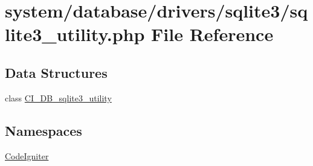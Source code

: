 \hypertarget{sqlite3__utility_8php}{}\section{system/database/drivers/sqlite3/sqlite3\+\_\+utility.php File Reference}
\label{sqlite3__utility_8php}
\subsection*{Data Structures}
\begin{DoxyCompactItemize}
\item 
class \mbox{\hyperlink{class_c_i___d_b__sqlite3__utility}{C\+I\+\_\+\+D\+B\+\_\+sqlite3\+\_\+utility}}
\end{DoxyCompactItemize}
\subsection*{Namespaces}
\begin{DoxyCompactItemize}
\item 
 \mbox{\hyperlink{namespace_code_igniter}{Code\+Igniter}}
\end{DoxyCompactItemize}
